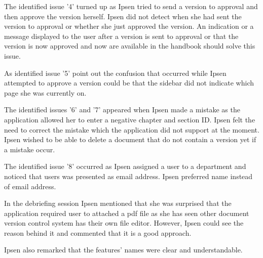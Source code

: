 The identified issue '4' turned up as Ipsen tried to send a version to approval and then  approve the version herself.
Ipsen did not detect when she had sent the version to approval or whether she just approved the version. 
An indication or a message displayed to the user after a version is sent to approval or that the version is now approved and now are available in the handbook should solve this issue.

As identified issue '5' point out the confusion that occurred while Ipsen attempted to approve a version could be that the sidebar did not indicate which page she was currently on. 

The identified issues '6' and '7' appeared when Ipsen made a mistake as the application allowed her to enter a negative chapter and section ID. 
Ipsen felt the need to correct the mistake which the application did not support at the moment.
Ipsen wished to be able to delete a document that do not contain a version yet if a mistake occur.

The identified issue '8' occurred as Ipsen assigned a user to a department and noticed that users was presented as email address.
Ipsen preferred name instead of email address.

In the debriefing session Ipsen mentioned that she was surprised that the application required user to attached a pdf file as she has seen other document version control system has their own file editor.
However, Ipsen could see the reason behind it and commented that it is a good approach.

Ipsen also remarked that the features' names were clear and understandable. 



